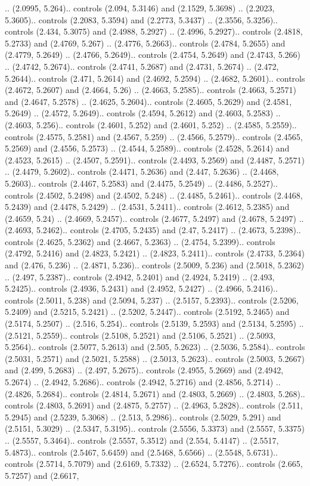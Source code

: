 .. (2.0995, 5.264).. controls (2.094, 5.3146) and (2.1529, 5.3698) .. (2.2023, 5.3605).. controls (2.2083, 5.3594) and (2.2773, 5.3437) .. (2.3556, 5.3256).. controls (2.434, 5.3075) and (2.4988, 5.2927) .. (2.4996, 5.2927).. controls (2.4818, 5.2733) and (2.4769, 5.267) .. (2.4776, 5.2663).. controls (2.4784, 5.2655) and (2.4779, 5.2649) .. (2.4766, 5.2649).. controls (2.4754, 5.2649) and (2.4743, 5.266) .. (2.4742, 5.2674).. controls (2.4741, 5.2687) and (2.4731, 5.2674) .. (2.472, 5.2644).. controls (2.471, 5.2614) and (2.4692, 5.2594) .. (2.4682, 5.2601).. controls (2.4672, 5.2607) and (2.4664, 5.26) .. (2.4663, 5.2585).. controls (2.4663, 5.2571) and (2.4647, 5.2578) .. (2.4625, 5.2604).. controls (2.4605, 5.2629) and (2.4581, 5.2649) .. (2.4572, 5.2649).. controls (2.4594, 5.2612) and (2.4603, 5.2583) .. (2.4603, 5.256).. controls (2.4601, 5.252) and (2.4601, 5.252) .. (2.4585, 5.2559).. controls (2.4575, 5.2581) and (2.4567, 5.259) .. (2.4566, 5.2579).. controls (2.4565, 5.2569) and (2.4556, 5.2573) .. (2.4544, 5.2589).. controls (2.4528, 5.2614) and (2.4523, 5.2615) .. (2.4507, 5.2591).. controls (2.4493, 5.2569) and (2.4487, 5.2571) .. (2.4479, 5.2602).. controls (2.4471, 5.2636) and (2.447, 5.2636) .. (2.4468, 5.2603).. controls (2.4467, 5.2583) and (2.4475, 5.2549) .. (2.4486, 5.2527).. controls (2.4502, 5.2498) and (2.4502, 5.248) .. (2.4485, 5.2461).. controls (2.4468, 5.2439) and (2.4478, 5.2429) .. (2.4531, 5.2411).. controls (2.4612, 5.2385) and (2.4659, 5.24) .. (2.4669, 5.2457).. controls (2.4677, 5.2497) and (2.4678, 5.2497) .. (2.4693, 5.2462).. controls (2.4705, 5.2435) and (2.47, 5.2417) .. (2.4673, 5.2398).. controls (2.4625, 5.2362) and (2.4667, 5.2363) .. (2.4754, 5.2399).. controls (2.4792, 5.2416) and (2.4823, 5.2421) .. (2.4823, 5.2411).. controls (2.4733, 5.2364) and (2.476, 5.236) .. (2.4871, 5.236).. controls (2.5009, 5.236) and (2.5018, 5.2362) .. (2.497, 5.2387).. controls (2.4942, 5.2401) and (2.4924, 5.2419) .. (2.493, 5.2425).. controls (2.4936, 5.2431) and (2.4952, 5.2427) .. (2.4966, 5.2416).. controls (2.5011, 5.238) and (2.5094, 5.237) .. (2.5157, 5.2393).. controls (2.5206, 5.2409) and (2.5215, 5.2421) .. (2.5202, 5.2447).. controls (2.5192, 5.2465) and (2.5174, 5.2507) .. (2.516, 5.254).. controls (2.5139, 5.2593) and (2.5134, 5.2595) .. (2.5121, 5.2559).. controls (2.5108, 5.2521) and (2.5106, 5.2521) .. (2.5093, 5.2564).. controls (2.5077, 5.2613) and (2.505, 5.2623) .. (2.5036, 5.2584).. controls (2.5031, 5.2571) and (2.5021, 5.2588) .. (2.5013, 5.2623).. controls (2.5003, 5.2667) and (2.499, 5.2683) .. (2.497, 5.2675).. controls (2.4955, 5.2669) and (2.4942, 5.2674) .. (2.4942, 5.2686).. controls (2.4942, 5.2716) and (2.4856, 5.2714) .. (2.4826, 5.2684).. controls (2.4814, 5.2671) and (2.4803, 5.2669) .. (2.4803, 5.268).. controls (2.4803, 5.2691) and (2.4875, 5.2757) .. (2.4963, 5.2828).. controls (2.511, 5.2945) and (2.5239, 5.3068) .. (2.513, 5.2986).. controls (2.5029, 5.291) and (2.5151, 5.3029) .. (2.5347, 5.3195).. controls (2.5556, 5.3373) and (2.5557, 5.3375) .. (2.5557, 5.3464).. controls (2.5557, 5.3512) and (2.554, 5.4147) .. (2.5517, 5.4873).. controls (2.5467, 5.6459) and (2.5468, 5.6566) .. (2.5548, 5.6731).. controls (2.5714, 5.7079) and (2.6169, 5.7332) .. (2.6524, 5.7276).. controls (2.665, 5.7257) and (2.6617, 